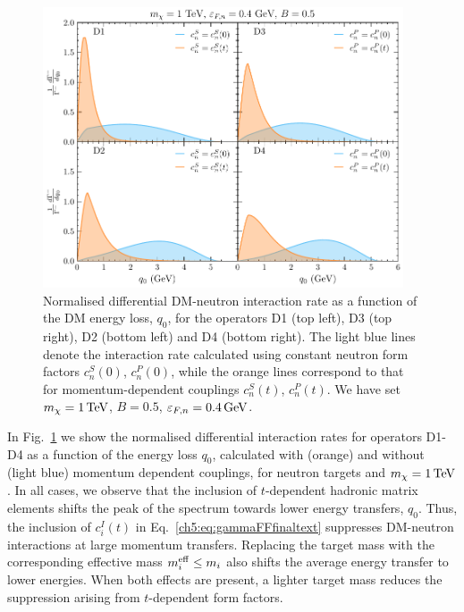 \begin{figure}[t!bp] 
\centering
\includegraphics[width=0.95\textwidth]{capture_3/norm_diff_intrate_q_D1-D4.pdf} 
\caption{Normalised differential DM-neutron interaction rate as a function of the DM energy loss, $q_0$, for the operators D1 (top left), D3 (top right), D2 (bottom left) and D4 (bottom right). The light blue lines denote the interaction rate calculated using constant neutron form factors $c_n^S(0)$, $c_n^P(0)$, while the orange lines correspond to that for momentum-dependent couplings $c_n^S(t)$, $c_n^P(t)$. We have set $m_\chi=1{\rm \,TeV}$, $B=0.5$, $\varepsilon_{F,n}=0.4{\rm \,GeV}$.
}
\label{ch5:fig:intrateqtr1}
\end{figure}



In Fig.~\ref{ch5:fig:intrateqtr1} we show the normalised differential interaction rates for operators D1-D4 as a function of the energy loss $q_0$, calculated with (orange) and without (light blue) momentum dependent couplings, for neutron targets and $m_\chi=1{\rm \,TeV}$. In all cases, we observe that the inclusion of $t$-dependent hadronic matrix elements shifts the peak of the spectrum towards lower energy transfers, $q_0$. 
Thus, the inclusion of $c_i^I(t)$ in Eq.~\ref{ch5:eq:gammaFFfinaltext} suppresses DM-neutron interactions at large momentum transfers. 
Replacing the target mass with the corresponding effective mass $m_i^{\rm eff}\leq m_i$ also shifts the average energy transfer to lower energies.  When both effects are present, a lighter target mass reduces the suppression arising from $t$-dependent form factors. 

